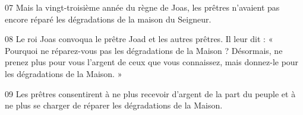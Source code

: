 
07 Mais la vingt-troisième année du règne de Joas, les prêtres n’avaient pas encore réparé les dégradations de la maison du Seigneur.

08 Le roi Joas convoqua le prêtre Joad et les autres prêtres. Il leur dit : « Pourquoi ne réparez-vous pas les dégradations de la Maison ? Désormais, ne prenez plus pour vous l’argent de ceux que vous connaissez, mais donnez-le pour les dégradations de la Maison. »

09 Les prêtres consentirent à ne plus recevoir d’argent de la part du peuple et à ne plus se charger de réparer les dégradations de la Maison.

